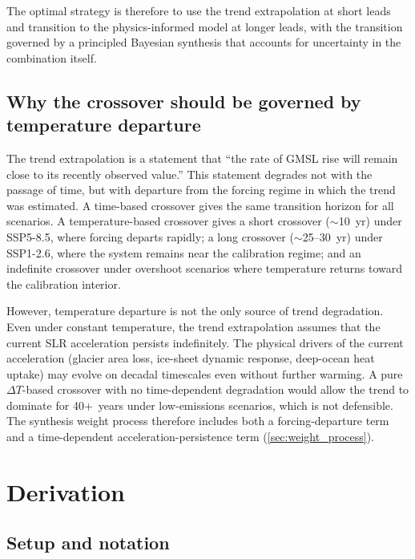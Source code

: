 \documentclass[11pt]{article}
\newcommand{\dT}{\Delta T}
\begin{document}
The optimal strategy is therefore to use the trend extrapolation at short leads and transition to the physics-informed model at longer leads, with the transition governed by a principled Bayesian synthesis that accounts for uncertainty in the combination itself.


\subsection{Why the crossover should be governed by temperature departure}

The trend extrapolation is a statement that ``the rate of GMSL rise will remain close to its recently observed value.''  This statement degrades not with the passage of time, but with departure from the forcing regime in which the trend was estimated.  A time-based crossover gives the same transition horizon for all scenarios.  A temperature-based crossover gives a short crossover ($\sim$10~yr) under SSP5-8.5, where forcing departs rapidly; a long crossover ($\sim$25--30~yr) under SSP1-2.6, where the system remains near the calibration regime; and an indefinite crossover under overshoot scenarios where temperature returns toward the calibration interior.

However, temperature departure is not the only source of trend degradation.  Even under constant temperature, the trend extrapolation assumes that the current SLR acceleration persists indefinitely.  The physical drivers of the current acceleration (glacier area loss, ice-sheet dynamic response, deep-ocean heat uptake) may evolve on decadal timescales even without further warming.  A pure $\dT$-based crossover with no time-dependent degradation would allow the trend to dominate for 40+~years under low-emissions scenarios, which is not defensible.  The synthesis weight process therefore includes both a forcing-departure term and a time-dependent acceleration-persistence term (\cref{sec:weight_process}).


\section{Derivation}

\subsection{Setup and notation}
\end{document}
